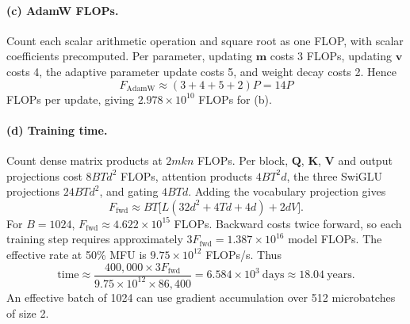 \documentclass{article}
\newif\ifhascitations
\begin{document}
\paragraph{(c) AdamW FLOPs.}
Count each scalar arithmetic operation and square root as one FLOP, with scalar coefficients precomputed. Per parameter, updating $\mathbf{m}$ costs 3 FLOPs, updating $\mathbf{v}$ costs 4, the adaptive parameter update costs 5, and weight decay costs 2. Hence
\[
F_{\mathrm{AdamW}}\approx(3+4+5+2)P=14P
\]
FLOPs per update, giving $2.978\times10^{10}$ FLOPs for (b).

\paragraph{(d) Training time.}
Count dense matrix products at $2mkn$ FLOPs. Per block, $\mathbf{Q}$, $\mathbf{K}$, $\mathbf{V}$ and output projections cost $8BTd^2$ FLOPs, attention products $4BT^2d$, the three SwiGLU projections $24BTd^2$, and gating $4BTd$. Adding the vocabulary projection gives
\[
F_{\mathrm{fwd}}\approx BT\bigl[L(32d^2+4Td+4d)+2dV\bigr].
\]
For $B=1024$, $F_{\mathrm{fwd}}\approx4.622\times10^{15}$ FLOPs. Backward costs twice forward, so each training step requires approximately $3F_{\mathrm{fwd}}=1.387\times10^{16}$ model FLOPs. The effective rate at 50\% MFU is $9.75\times10^{12}$ FLOPs/s. Thus
\[
\text{time}\approx
\frac{400{,}000\times3F_{\mathrm{fwd}}}{9.75\times10^{12}\times86{,}400}
=6.584\times10^3\ \text{days}\approx18.04\ \text{years}.
\]
An effective batch of 1024 can use gradient accumulation over 512 microbatches of size 2.

\ifhascitations\printbibliography\fi
\end{document}
